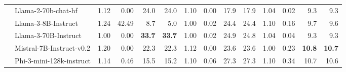 \begin{table}[]
{\begin{tabular}{l|l|rrrr|rrrr|rrrr}
                                                                     & Llama-2-70b-chat-hf             & 1.12                             & 0.00                    & 24.0                          & 24.0                               & 1.10                             & 0.00                    & 17.9                          & 17.9                               & 1.04                             & 0.02                             & 9.3                           & 9.3                               \\
                                                                     & Llama-3-8B-Instruct             & 1.24                             & 42.49                            & 8.7                           & 5.0                                & 1.00                             & 0.02                             & 24.4                          & 24.4                               & 1.10                             & 0.16                             & 9.7                           & 9.6                               \\
                                                                     & Llama-3-70B-Instruct            & 1.00                             & 0.00                    & \textbf{33.7}                          & \textbf{33.7}                               & 1.00                             & 0.02                             & 24.9                          & 24.8                               & 1.04                             & 0.04                             & 9.3                           & 9.3                               \\
                                                                     & Mistral-7B-Instruct-v0.2        & 1.20                             & 0.00                    & 22.3                          & 22.3                               & 1.12                             & 0.00                    & 23.6                          & 23.6                               & 1.00                             & 0.23                             & \textbf{10.8}                          & \textbf{10.7}                              \\
                                                                     & Phi-3-mini-128k-instruct        & 1.14                             & 0.46                             & 15.5                          & 15.2                               & 1.10                             & 0.06                             & 27.3                          & 27.3                               & 1.10                             & 0.34                             & 10.7                          & 10.6                              \\ \bottomrule

\end{tabular}}
\end{table}
